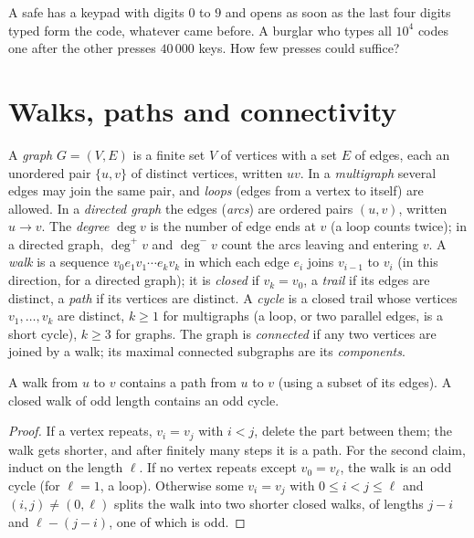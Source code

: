 \begin{think}
A safe has a keypad with digits $0$ to $9$ and opens as soon as the last four digits typed form the code, whatever came
before. A burglar who types all $10^4$ codes one after the other presses $40\,000$ keys. How few presses could suffice?
\end{think}

\section{Walks, paths and connectivity}

A \emph{graph} $G=(V,E)$ is a finite set $V$ of vertices with a set $E$ of edges, each an unordered pair $\{u,v\}$ of distinct vertices, written $uv$. In a
\emph{multigraph} several edges may join the same pair, and \emph{loops} (edges from a vertex to itself) are allowed. In a \emph{directed graph} the edges
(\emph{arcs}) are ordered pairs $(u,v)$, written $u\to v$. The \emph{degree} $\deg v$ is the number of edge ends at $v$ (a loop counts twice); in a directed
graph, $\deg^+v$ and $\deg^-v$ count the arcs leaving and entering $v$. A \emph{walk} is a sequence $v_0e_1v_1\cdots e_kv_k$ in which each edge $e_i$ joins $v_{i-1}$ to $v_i$
(in this direction, for a directed graph); it is \emph{closed} if $v_k=v_0$, a \emph{trail} if its edges are distinct, a \emph{path} if its vertices are distinct. A \emph{cycle} is
a closed trail whose vertices $v_1,\dots,v_k$ are distinct, $k\ge1$ for multigraphs (a loop, or two parallel edges, is a short cycle), $k\ge3$ for
graphs. The graph is \emph{connected} if any two vertices are joined by a walk; its maximal connected subgraphs are its \emph{components}.

\begin{lemma}\label{lem:walkpath}
A walk from $u$ to $v$ contains a path from $u$ to $v$ (using a subset of its edges). A closed walk of odd length contains an
odd cycle.
\end{lemma}
\begin{proof}
If a vertex repeats, $v_i=v_j$ with $i<j$, delete the part between them; the walk gets shorter, and after finitely many steps it is a
path. For the second claim, induct on the length $\ell$. If no vertex repeats except $v_0=v_\ell$, the walk is an odd cycle (for $\ell=1$, a
loop). Otherwise some $v_i=v_j$ with $0\le i<j\le\ell$ and $(i,j)\ne(0,\ell)$ splits the walk into two shorter closed walks, of lengths $j-i$ and
$\ell-(j-i)$, one of which is odd.
\end{proof}

